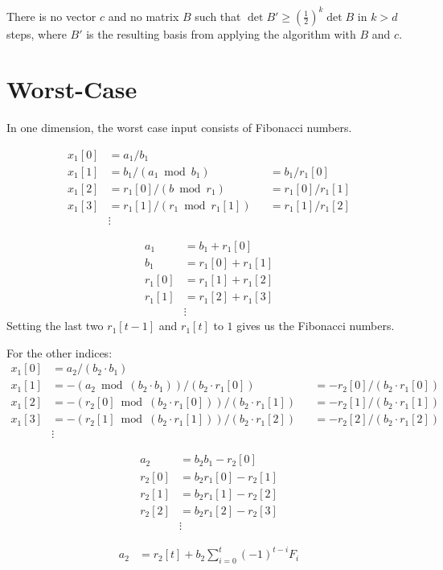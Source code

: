 \documentclass[english,version-2020-11]{uzl-thesis}
\begin{document}
\begin{lemma}
  There is no vector $c$ and no matrix $B$
  such that $\det B' \ge \left(\frac12\right)^k \det B$ in $k > d$ steps,
  where $B'$ is the resulting basis from applying the algorithm with $B$ and $c$.
\end{lemma}

\section{Worst-Case}

In one dimension, the worst case input consists of Fibonacci numbers.

\[\begin{aligned}
  x_1[0] & = a_1/b_1                       \\
  x_1[1] & = b_1/(a_1 \bmod b_1)              && = b_1 / r_1[0]      \\
  x_1[2] & = r_1[0]/(b \bmod r_1)       && = r_1[0] / r_1[1] \\
  x_1[3] & = r_1[1]/(r_1 \bmod r_1[1])  && = r_1[1] / r_1[2] \\
         & \vdots
\end{aligned}\]

\begin{align*}
  a_1    & = b_1 + r_1[0]      \\
  b_1    & = r_1[0]+ r_1[1]  \\
  r_1[0] & = r_1[1] + r_1[2] \\
  r_1[1] & = r_1[2] + r_1[3] \\
         & \vdots
\end{align*}
Setting the last two $r_1[t-1]$ and $r_1[t]$ to $1$ gives us the Fibonacci numbers.

For the other indices:
\[\begin{aligned}
  x_1[0] & = a_2/(b_2 \cdot b_1)                                    \\
  x_1[1] & = -(a_2 \bmod (b_2 \cdot b_1)) / (b_2 \cdot r_1[0])        &  & = -r_2[0] / (b_2 \cdot r_1[0]) \\
  x_1[2] & = -(r_2[0] \bmod (b_2 \cdot r_1[0])) / (b_2 \cdot r_1[1])  &  & = -r_2[1] / (b_2 \cdot r_1[1]) \\
  x_1[3] & = -(r_2[1] \bmod (b_2 \cdot r_1[1])) / (b_2 \cdot r_1[2])  &  & = -r_2[2] / (b_2 \cdot r_1[2]) \\
         & \vdots
\end{aligned}\]

\begin{align*}
  a_2    & = b_2 b_1 - r_2[0]      \\
  r_2[0] & = b_2 r_1[0] - r_2[1] \\
  r_2[1] & = b_2 r_1[1] - r_2[2] \\
  r_2[2] & = b_2 r_1[2] - r_2[3] \\
         & \vdots
\end{align*}

\begin{align*}
  a_2 & = r_2[t] + b_2 \sum_{i=0}^t (-1)^{t-i} F_i
\end{align*}

\begin{bibtex-entries}
\end{bibtex-entries}
\end{document}
